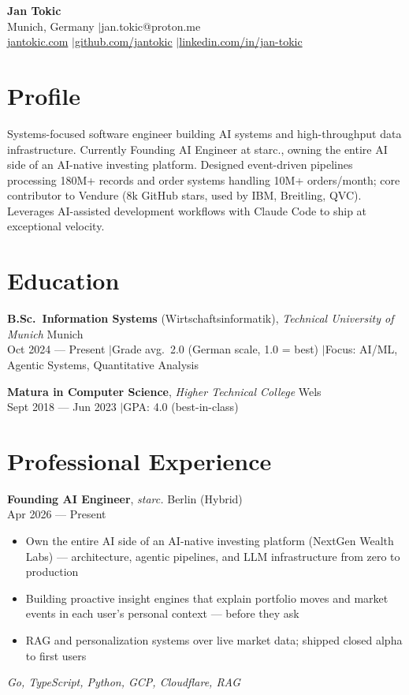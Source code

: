 \documentclass[a4paper,10pt]{article}
\newcommand{\entry}[4]{%
  \textbf{#1}, \textit{#2} \hfill #3 \\ \vspace{-2pt}
  {\small #4}%
}
\begin{document}
\begin{center}
  {\LARGE\bfseries Jan Tokic} \\[2pt]
  Munich, Germany \enspace$\vert$\enspace jan.tokic@proton.me \\[1pt]
  \href{https://jantokic.com}{jantokic.com} \enspace$\vert$\enspace \href{https://github.com/jantokic}{github.com/jantokic} \enspace$\vert$\enspace \href{https://linkedin.com/in/jan-tokic}{linkedin.com/in/jan-tokic}
\end{center}

\vspace{-4pt}

\section{Profile}
Systems-focused software engineer building AI systems and high-throughput data infrastructure. Currently Founding AI Engineer at starc., owning the entire AI side of an AI-native investing platform. Designed event-driven pipelines processing 180M+ records and order systems handling 10M+ orders/month; core contributor to Vendure (8k GitHub stars, used by IBM, Breitling, QVC). Leverages AI-assisted development workflows with Claude Code to ship at exceptional velocity.

\section{Education}

\textbf{B.Sc.\ Information Systems} (Wirtschaftsinformatik), \textit{Technical University of Munich} \hfill Munich \\
{\small Oct 2024 --- Present \enspace$\vert$\enspace Grade avg.\ 2.0 (German scale, 1.0 = best) \enspace$\vert$\enspace Focus: AI/ML, Agentic Systems, Quantitative Analysis}

\vspace{3pt}
\textbf{Matura in Computer Science}, \textit{Higher Technical College} \hfill Wels \\
{\small Sept 2018 --- Jun 2023 \enspace$\vert$\enspace GPA: 4.0 (best-in-class)}

\section{Professional Experience}

\entry{Founding AI Engineer}{starc.}{Berlin (Hybrid)}{Apr 2026 --- Present}
\begin{itemize}
  \item Own the entire AI side of an AI-native investing platform (NextGen Wealth Labs) --- architecture, agentic pipelines, and LLM infrastructure from zero to production
  \item Building proactive insight engines that explain portfolio moves and market events in each user's personal context --- before they ask
  \item RAG and personalization systems over live market data; shipped closed alpha to first users
\end{itemize}
{\small\textit{Go, TypeScript, Python, GCP, Cloudflare, RAG}}
\end{document}
